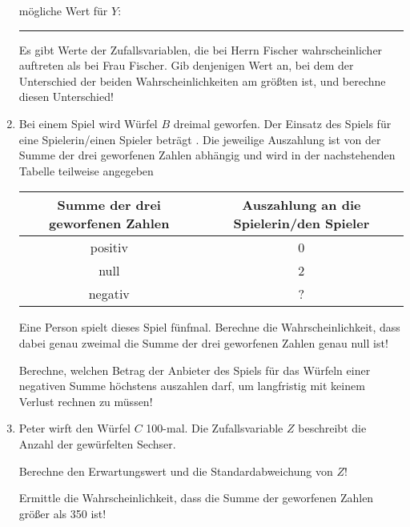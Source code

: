 \begin{langesbeispiel}
\begin{enumerate}
	mögliche Wert für $Y$: \rule{5cm}{0.3pt}
	
	Es gibt Werte der Zufallsvariablen, die bei Herrn Fischer wahrscheinlicher auftreten als bei Frau Fischer. Gib denjenigen Wert an, bei dem der Unterschied der beiden Wahrscheinlichkeiten am größten ist, und berechne diesen Unterschied!
	
	\item Bei einem Spiel wird Würfel $B$ dreimal geworfen. Der Einsatz des Spiels für eine Spielerin/einen Spieler beträgt . Die jeweilige Auszahlung ist von der Summe der drei geworfenen Zahlen abhängig und wird in der nachstehenden Tabelle teilweise angegeben
	
	\begin{center}
		\begin{tabular}{|c|c|}\hline
		\cellcolor[gray]{0.9}Summe der drei geworfenen Zahlen&\cellcolor[gray]{0.9}Auszahlung an die Spielerin/den Spieler\\ \hline
		positiv&0\\ \hline
		null&2\\ \hline
		negativ&?\\ \hline		
		\end{tabular}
	\end{center}

Eine Person spielt dieses Spiel fünfmal. Berechne die Wahrscheinlichkeit, dass dabei genau zweimal die Summe der drei geworfenen Zahlen genau null ist!

 Berechne, welchen Betrag der Anbieter des Spiels für das Würfeln einer negativen Summe höchstens auszahlen darf, um langfristig mit keinem Verlust rechnen zu müssen! 

\item  Peter wirft den Würfel $C$ 100-mal. Die Zufallsvariable $Z$ beschreibt die Anzahl der gewürfelten Sechser.

 Berechne den Erwartungswert und die Standardabweichung von $Z$!

 Ermittle die Wahrscheinlichkeit, dass die Summe der geworfenen Zahlen größer als 350 ist!    
						\end{enumerate}\leer
				
\end{langesbeispiel}
